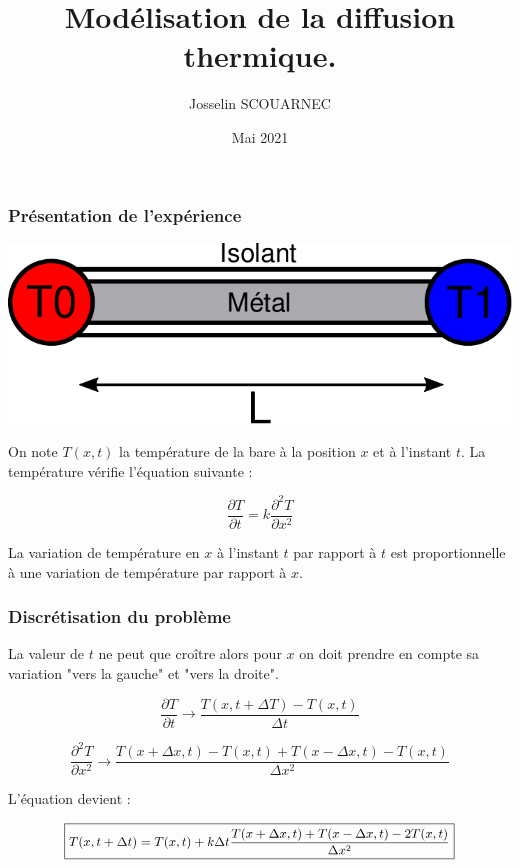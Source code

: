 \documentclass{beamer}
\title{Modélisation de la diffusion thermique.}
\author{Josselin SCOUARNEC}
\date{Mai 2021}
\begin{document}
    \maketitle
    

    \begin{frame}
    \frametitle{Présentation de l'expérience}

    \begin{center}
    \includegraphics[width=0.6\linewidth]{figs/schem.pdf}
    \end{center}

    On note $T(x, t)$ la température de la bare à la position $x$ et à l'instant $t$. La température vérifie l'équation suivante :

    $$\frac{\partial T}{\partial t } = k\frac{\partial^2 T}{\partial x^2 }$$

    La variation de température en $x$ à l'instant $t$ par rapport à $t$ est proportionnelle à une variation de température par rapport à $x$. 


    \end{frame}

    \begin{frame}
    \frametitle{Discrétisation du problème}

    La valeur de $t$ ne peut que croître alors pour $x$ on doit prendre en compte sa variation "vers la gauche" et "vers la droite".

    \bigskip

    $$\frac{\partial T}{\partial t } \longrightarrow \frac{T(x, t + \Delta T) - T(x, t)}{\Delta t }$$


   	$$\frac{\partial^2 T}{\partial x^2} \longrightarrow \frac{T(x+ \Delta x, t)-T(x, t) + T(x-\Delta x, t) -T(x, t)}{\Delta x ^2 }$$

    \bigskip

    L'équation devient : 

    $$\small\boxed{T(x, t + \Delta t) = T(x, t) + k \Delta t \frac{T(x+ \Delta x, t) + T(x-\Delta x, t) -2T(x, t)}{\Delta x ^2 }}$$


    \end{frame}
\end{document}
